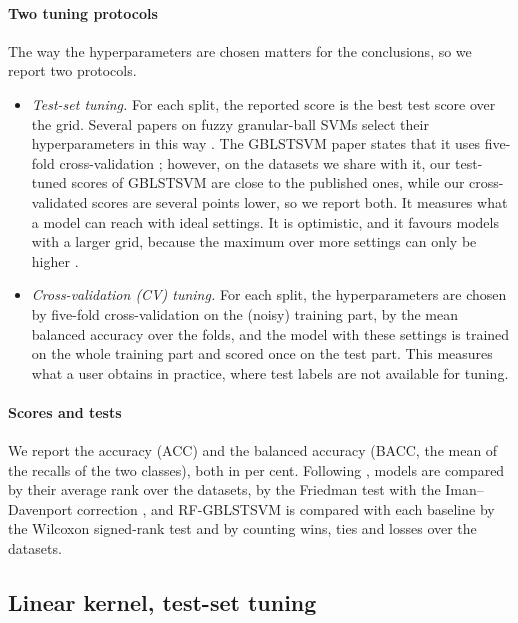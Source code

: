 \documentclass[preprint,12pt]{elsarticle}
\newcommand{\RF}{RF-GBLSTSVM}
\begin{document}
\paragraph{Two tuning protocols} The way the hyperparameters are chosen matters for the conclusions, so we report two protocols.
\begin{itemize}
\item \emph{Test-set tuning.} For each split, the reported score is the best test score over the grid. Several papers on fuzzy granular-ball SVMs select their hyperparameters in this way \cite{xia2024gbfsvm,lang2025gbftsvm}. The GBLSTSVM paper states that it uses five-fold cross-validation \cite{tanveer2024gblstsvm}; however, on the datasets we share with it, our test-tuned scores of GBLSTSVM are close to the published ones, while our cross-validated scores are several points lower, so we report both. It measures what a model can reach with ideal settings. It is optimistic, and it favours models with a larger grid, because the maximum over more settings can only be higher \cite{cawley2010}.
\item \emph{Cross-validation (CV) tuning.} For each split, the hyperparameters are chosen by five-fold cross-validation on the (noisy) training part, by the mean balanced accuracy over the folds, and the model with these settings is trained on the whole training part and scored once on the test part. This measures what a user obtains in practice, where test labels are not available for tuning.
\end{itemize}

\paragraph{Scores and tests} We report the accuracy (ACC) and the balanced accuracy (BACC, the mean of the recalls of the two classes), both in per cent. Following \cite{demsar2006}, models are compared by their average rank over the datasets, by the Friedman test with the Iman--Davenport correction \cite{iman1980}, and \RF{} is compared with each baseline by the Wilcoxon signed-rank test and by counting wins, ties and losses over the datasets.

\subsection{Linear kernel, test-set tuning}
\end{document}
